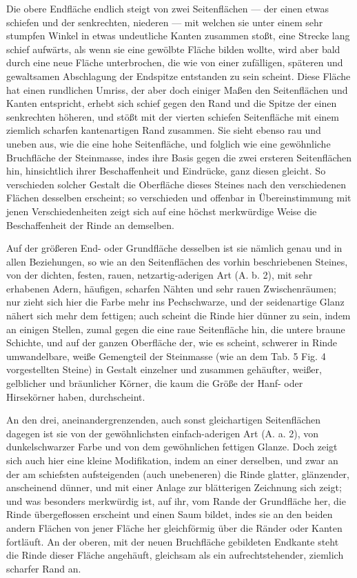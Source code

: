 \documentclass[a4paper, 11pt, oneside, german]{article}
\begin{document}
Die obere Endfläche endlich steigt von zwei Seitenflächen --- der einen etwas schiefen und der senkrechten, niederen --- mit welchen sie unter einem sehr stumpfen Winkel in etwas undeutliche Kanten zusammen stoßt, eine Strecke lang schief aufwärts, als wenn sie eine gewölbte Fläche bilden wollte, wird aber bald durch eine neue Fläche unterbrochen, die wie von einer zufälligen, späteren und gewaltsamen Abschlagung der Endspitze entstanden zu sein scheint. Diese Fläche hat einen rundlichen Umriss, der aber doch einiger Maßen den Seitenflächen und Kanten entspricht, erhebt sich schief gegen den Rand und die Spitze der einen senkrechten höheren, und stößt mit der vierten schiefen Seitenfläche mit einem ziemlich scharfen kantenartigen Rand zusammen. Sie sieht ebenso rau und uneben aus, wie die eine hohe Seitenfläche, und folglich wie eine gewöhnliche Bruchfläche der Steinmasse, indes ihre Basis gegen die zwei ersteren Seitenflächen hin, hinsichtlich ihrer Beschaffenheit und Eindrücke, ganz diesen gleicht. So verschieden solcher Gestalt die Oberfläche dieses Steines nach den verschiedenen Flächen desselben erscheint; so verschieden und offenbar in Übereinstimmung mit jenen Verschiedenheiten zeigt sich auf eine höchst merkwürdige Weise die Beschaffenheit der Rinde an demselben.

Auf der größeren End- oder Grundfläche desselben ist sie nämlich genau und in allen Beziehungen, so wie an den Seitenflächen des vorhin beschriebenen Steines, von der dichten, festen, rauen, netzartig-aderigen Art (A. b. 2), mit sehr erhabenen Adern, häufigen, scharfen Nähten und sehr rauen Zwischenräumen; nur zieht sich hier die Farbe mehr ins Pechschwarze, und der seidenartige Glanz nähert sich mehr dem fettigen; auch scheint die Rinde hier dünner zu sein, indem an einigen Stellen, zumal gegen die eine raue Seitenfläche hin, die untere braune Schichte, und auf der ganzen Oberfläche der, wie es scheint, schwerer in Rinde umwandelbare, weiße Gemengteil der Steinmasse (wie an dem Tab. 5 Fig. 4 vorgestellten Steine) in Gestalt einzelner und zusammen gehäufter, weißer, gelblicher und bräunlicher Körner, die kaum die Größe der Hanf- oder Hirsekörner haben, durchscheint.

An den drei, aneinandergrenzenden, auch sonst gleichartigen Seitenflächen dagegen ist sie von der gewöhnlichsten einfach-aderigen Art (A. a. 2), von dunkelschwarzer Farbe und von dem gewöhnlichen fettigen Glanze. Doch zeigt sich auch hier eine kleine Modifikation, indem an einer derselben, und zwar an der am schiefsten aufsteigenden (auch unebeneren) die Rinde glatter, glänzender, anscheinend dünner, und mit einer Anlage zur blätterigen Zeichnung sich zeigt; und was besonders merkwürdig ist, auf ihr, vom Rande der Grundfläche her, die Rinde übergeflossen erscheint und einen Saum bildet, indes sie an den beiden andern Flächen von jener Fläche her gleichförmig über die Ränder oder Kanten fortläuft. An der oberen, mit der neuen Bruchfläche gebildeten Endkante steht die Rinde dieser Fläche angehäuft, gleichsam als ein aufrechtstehender, ziemlich scharfer Rand an.
\end{document}
